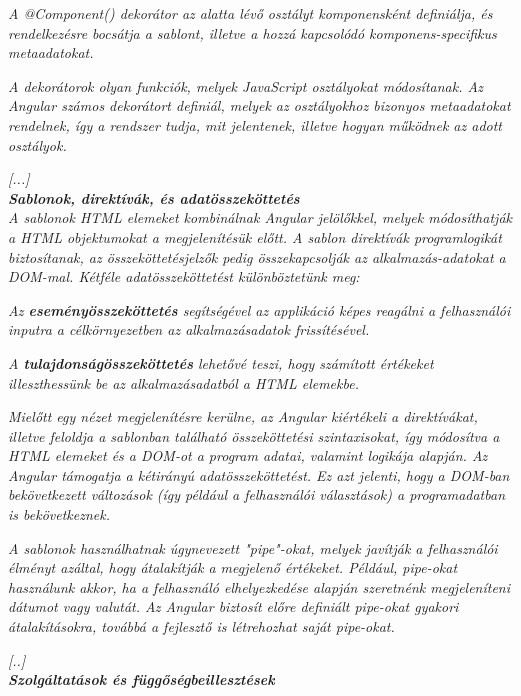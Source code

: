\textit{A @Component() dekorátor az alatta lévő osztályt komponensként definiálja, és rendelkezésre bocsátja a sablont, illetve a hozzá kapcsolódó komponens-specifikus metaadatokat.}

\textit{A dekorátorok olyan funkciók, melyek JavaScript osztályokat módosítanak. Az Angular számos dekorátort definiál, melyek az osztályokhoz bizonyos metaadatokat rendelnek, így a rendszer tudja, mit jelentenek, illetve hogyan működnek az adott osztályok.}

\textit{[...]}\\

\noindent\textit{\textbf{Sablonok, direktívák, és adatösszeköttetés}}\\

\textit{A sablonok HTML elemeket kombinálnak Angular jelölőkkel, melyek módosíthatják a HTML objektumokat a megjelenítésük előtt. A sablon direktívák programlogikát biztosítanak, az összeköttetésjelzők pedig összekapcsolják az alkalmazás-adatokat a DOM-mal. Kétféle adatösszeköttetést különböztetünk meg:}

\textit{Az \textbf{eseményösszeköttetés} segítségével az applikáció képes reagálni a felhasználói inputra a célkörnyezetben az alkalmazásadatok frissítésével.}

\textit{A \textbf{tulajdonságösszeköttetés} lehetővé teszi, hogy számított értékeket illeszthessünk be az alkalmazásadatból a HTML elemekbe.}

\textit{Mielőtt egy nézet megjelenítésre kerülne, az Angular kiértékeli a direktívákat, illetve feloldja a sablonban található összeköttetési szintaxisokat, így módosítva a HTML elemeket és a DOM-ot a program adatai, valamint logikája alapján. Az Angular támogatja a kétirányú adatösszeköttetést. Ez azt jelenti, hogy a DOM-ban bekövetkezett változások (így például a felhasználói választások) a programadatban is bekövetkeznek.}

\textit{A sablonok használhatnak úgynevezett "pipe"-okat, melyek javítják a felhasználói élményt azáltal, hogy átalakítják a megjelenő értékeket. Például, pipe-okat használunk akkor, ha a felhasználó elhelyezkedése alapján szeretnénk megjeleníteni dátumot vagy valutát. Az Angular biztosít előre definiált pipe-okat gyakori átalakításokra, továbbá a fejlesztő is létrehozhat saját pipe-okat.}

\textit{[..]}\\

\noindent\textit{\textbf{Szolgáltatások és függőségbeillesztések}}\\


